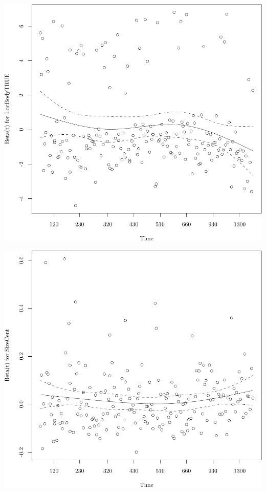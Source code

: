 \documentclass{article}
\begin{document}
\begin{knitrout}
{}




{\centering \includegraphics[width=\maxwidth]{figure/05-eda-ph-check-full-4} 

}




{\centering \includegraphics[width=\maxwidth]{figure/05-eda-ph-check-full-5} 

}
\end{knitrout}
\end{document}
